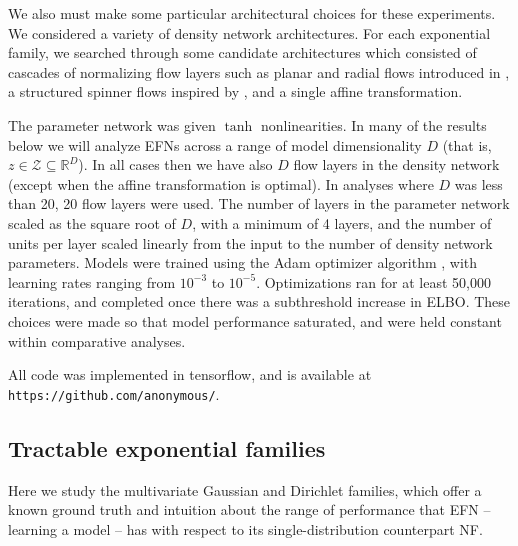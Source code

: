 \documentclass{article}
\begin{document}
We also must make some particular architectural choices for these experiments.  
We considered a variety of density network architectures.  For each exponential family, we searched through some candidate architectures which consisted of cascades of normalizing flow layers such as planar and radial flows introduced in \citep{rezende2015variational}, a structured spinner flows inspired by \citep{ bojarski2016structured}, and a single affine transformation.

The parameter network was given $\tanh$ nonlinearities. 
In many of the results below we will analyze EFNs across a range of model dimensionality $D$ (that is, $z \in \mathcal{Z} \subseteq \mathbb{R}^D$).    In all cases then we have also $D$ flow layers in the density network (except when the affine transformation is optimal).  In analyses where $D$ was less than 20, 20 flow layers were used.  The number of layers in the parameter network scaled as the square root of $D$, with a minimum of 4 layers, and the number of units per layer scaled linearly from the input to the number of density network parameters. Models were trained using the Adam optimizer algorithm \citep{kingma2014adam}, with learning rates ranging from $10^{-3}$ to $10^{-5}$.  Optimizations ran for at least 50,000 iterations, and completed once there was a subthreshold increase in ELBO. These choices were made so that model performance saturated, and were held constant within comparative analyses.

All code was implemented in tensorflow, and is available at {\tt https://github.com/anonymous/}.

\subsection{Tractable exponential families}

Here we study the multivariate Gaussian and Dirichlet families, which offer a known ground truth and intuition about the range of performance that EFN -- learning a model – has with respect to its single-distribution counterpart NF. 
\end{document}

